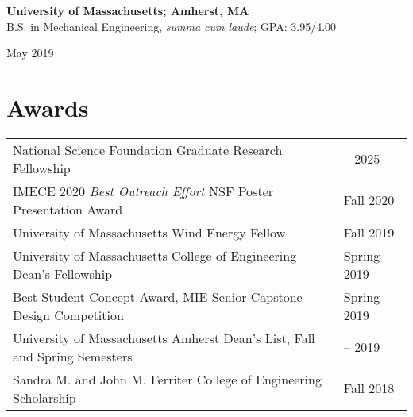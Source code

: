 \documentclass[letterpaper,11pt]{article}
\begin{document}
\vspace{7pt}

\begin{minipage}[t]{.80\textwidth}
\flushleft
\textbf{University of Massachusetts; Amherst, MA}\\
 B.S. in Mechanical Engineering, \textit{summa cum laude}; GPA: 3.95/4.00
\end{minipage}
\hfill
\begin{minipage}[t]{.19\textwidth}
\flushright
May 2019\\
\end{minipage}

\vspace{-1pt}

\section{Awards}
\vspace{-1pt}
{\selectfont
\begin{tabular}
  {>{\raggedright\arraybackslash}p{}%
   >{\raggedleft\arraybackslash}p{}%
  }
National Science Foundation Graduate Research Fellowship & 2020 -- 2025\\ %
IMECE 2020 \textit{Best Outreach Effort} NSF Poster Presentation Award &	Fall 2020 \\
University of Massachusetts Wind Energy Fellow & Fall 2019\\
University of Massachusetts College of Engineering Dean's Fellowship  & Spring 2019\\ %
Best Student Concept Award, MIE Senior Capstone Design Competition & Spring 2019\\
University of Massachusetts Amherst Dean's List, Fall and Spring Semesters & 2015 -- 2019 \\
Sandra M. and John M. Ferriter College of Engineering Scholarship  & Fall 2018\\ %

\end{tabular}
}
\vspace{-4pt}

\end{document}
